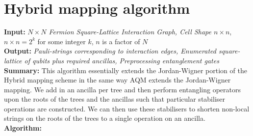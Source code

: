 \section{Hybrid\+ mapping algorithm}
\label{section:auxHybridmapping}
\noindent
\textbf{Input:} \textit{$N\times N$ Fermion Square-Lattice Interaction Graph, Cell Shape $n \times n$}, $n \times n = 2^k$ for some integer $k$, $n$ is a factor of $N$\\
\textbf{Output:} \textit{Pauli-strings corresponding to interaction edges, Enumerated square-lattice of qubits plus required ancillas, Preprocessing entanglement gates}\\
\textbf{Summary:} This algorithm essentially extends the Jordan-Wigner portion of the Hybrid mapping scheme in the same way AQM extends the Jordan-Wigner mapping. We add in an ancilla per tree and then perform entangling operators upon the roots of the trees and the ancillas such that particular stabiliser operations are constructed. We can then use these stabilisers to shorten non-local strings on the roots of the trees to a single operation on an ancilla.\\
\textbf{Algorithm:}
